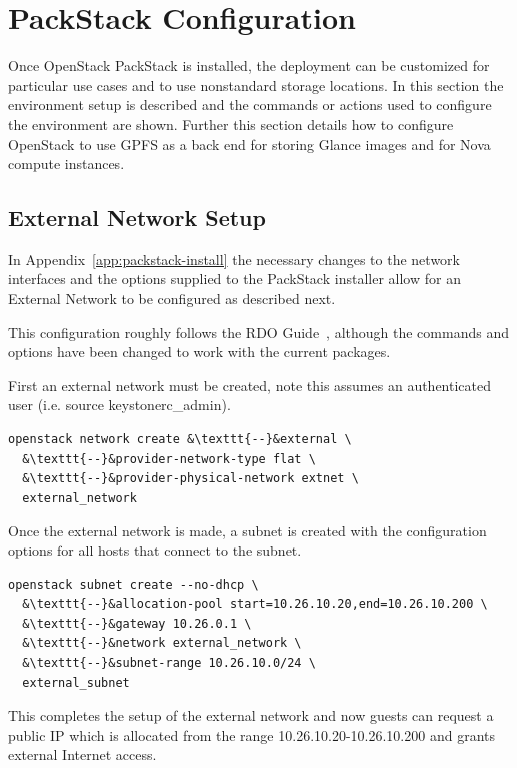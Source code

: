\section{PackStack Configuration}
\label{app:packstack-config}

Once OpenStack PackStack is installed, the deployment can be customized
for particular use cases and to use nonstandard storage locations. In
this section the environment setup is described and the commands or
actions used to configure the environment are shown. Further this
section details how to configure OpenStack to use GPFS as a back end for
storing Glance images and for Nova compute instances.

\subsection{External Network Setup}
\label{openstack-ext}
In Appendix~\ref{app:packstack-install} the necessary changes to the
network interfaces and the options supplied to the PackStack installer
allow for an External Network to be configured as described next.

This configuration roughly follows the RDO Guide~\cite{PackStacksetup},
although the commands and options have been changed to work with the
current packages.

First an external network must be created, note this assumes an
authenticated user (i.e. source keystonerc\_admin).
\begin{lstlisting}[escapechar=&]
  openstack network create &\texttt{--}&external \
  &\texttt{--}&provider-network-type flat \
  &\texttt{--}&provider-physical-network extnet \
  external_network
\end{lstlisting}

Once the external network is made, a subnet is created with the
configuration options for all hosts that connect to the subnet.

\begin{lstlisting}[escapechar=&]
  openstack subnet create --no-dhcp \
  &\texttt{--}&allocation-pool start=10.26.10.20,end=10.26.10.200 \
  &\texttt{--}&gateway 10.26.0.1 \
  &\texttt{--}&network external_network \
  &\texttt{--}&subnet-range 10.26.10.0/24 \
  external_subnet
\end{lstlisting}

This completes the setup of the external network and now guests can
request a public IP which is allocated from the range
10.26.10.20-10.26.10.200 and grants external Internet access.

